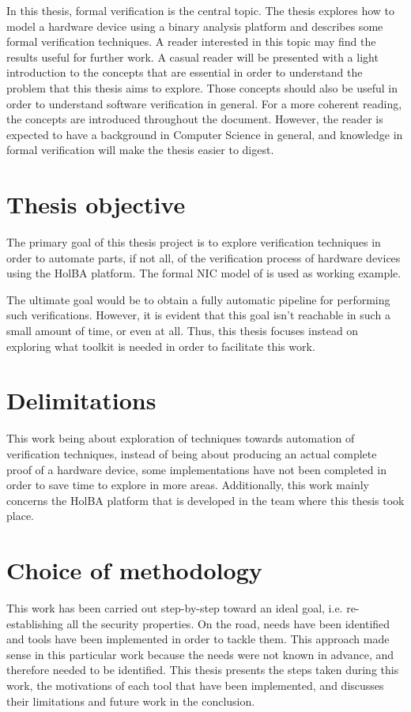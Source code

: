 \documentclass{kththesis}
\begin{document}
In this thesis, formal verification is the central topic. The thesis explores how to model a hardware device using a binary analysis platform and describes some formal verification techniques. A reader interested in this topic may find the results useful for further work. A casual reader will be presented with a light introduction to the concepts that are essential in order to understand the problem that this thesis aims to explore. Those concepts should also be useful in order to understand software verification in general. For a more coherent reading, the concepts are introduced throughout the document. However, the reader is expected to have a background in Computer Science in general, and knowledge in formal verification will make the thesis easier to digest.

\section{Thesis objective}

The primary goal of this thesis project is to explore verification techniques in order to automate parts, if not all, of the verification process of hardware devices using the HolBA platform. The formal \gls{NIC} model of \cite{haglund_formal_2016} is used as working example.

The ultimate goal would be to obtain a fully automatic pipeline for performing such verifications. However, it is evident that this goal isn't reachable in such a small amount of time, or even at all. Thus, this thesis focuses instead on exploring what toolkit is needed in order to facilitate this work.

\section{Delimitations}

This work being about exploration of techniques towards automation of verification techniques, instead of being about producing an actual complete proof of a hardware device, some implementations have not been completed in order to save time to explore in more areas. Additionally, this work mainly concerns the HolBA platform that is developed in the team where this thesis took place.

\section{Choice of methodology}

This work has been carried out step-by-step toward an ideal goal, i.e. re-establishing all the security properties. On the road, needs have been identified and tools have been implemented in order to tackle them. This approach made sense in this particular work because the needs were not known in advance, and therefore needed to be identified. This thesis presents the steps taken during this work, the motivations of each tool that have been implemented, and discusses their limitations and future work in the conclusion.
\end{document}
